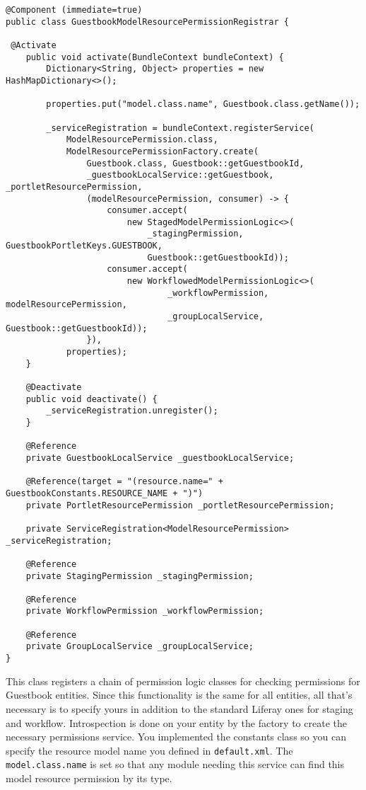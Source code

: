 \begin{enumerate}
\begin{verbatim}
@Component (immediate=true)
public class GuestbookModelResourcePermissionRegistrar {

 @Activate
    public void activate(BundleContext bundleContext) {
        Dictionary<String, Object> properties = new HashMapDictionary<>();

        properties.put("model.class.name", Guestbook.class.getName());

        _serviceRegistration = bundleContext.registerService(
            ModelResourcePermission.class,
            ModelResourcePermissionFactory.create(
                Guestbook.class, Guestbook::getGuestbookId,
                _guestbookLocalService::getGuestbook, _portletResourcePermission,
                (modelResourcePermission, consumer) -> {
                    consumer.accept(
                        new StagedModelPermissionLogic<>(
                            _stagingPermission, GuestbookPortletKeys.GUESTBOOK,
                            Guestbook::getGuestbookId));
                    consumer.accept(
                        new WorkflowedModelPermissionLogic<>(
                                _workflowPermission, modelResourcePermission,
                                _groupLocalService, Guestbook::getGuestbookId));
                }),
            properties);
    }

    @Deactivate
    public void deactivate() {
        _serviceRegistration.unregister();
    }

    @Reference
    private GuestbookLocalService _guestbookLocalService;

    @Reference(target = "(resource.name=" + GuestbookConstants.RESOURCE_NAME + ")")
    private PortletResourcePermission _portletResourcePermission;

    private ServiceRegistration<ModelResourcePermission> _serviceRegistration;

    @Reference
    private StagingPermission _stagingPermission;

    @Reference
    private WorkflowPermission _workflowPermission;

    @Reference
    private GroupLocalService _groupLocalService;
}
\end{verbatim}
\end{enumerate}

This class registers a chain of permission logic classes for checking
permissions for Guestbook entities. Since this functionality is the same
for all entities, all that's necessary is to specify yours in addition
to the standard Liferay ones for staging and workflow. Introspection is
done on your entity by the factory to create the necessary permissions
service. You implemented the constants class so you can specify the
resource model name you defined in \texttt{default.xml}. The
\texttt{model.class.name} is set so that any module needing this service
can find this model resource permission by its type.

